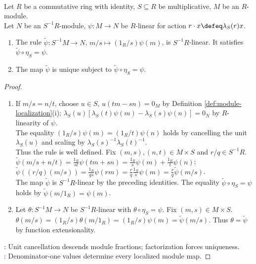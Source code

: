 \begin{theorem} \label{thm:module-localization-universal-property}
\\
Let $R$ be a commutative ring with identity, $S\subseteq R$ be multiplicative,  $M$ be an $R$-module.\\
Let $N$ be an $S^{-1}R$-module, $\psi:M\to N$ be $R$-linear for action $r\cdot x\defeq\lambda_S(r)x$.
\begin{enumerate}[label=(\roman*)]
\setlength{\itemsep}{0pt}
\item The rule $\widetilde{\psi}:S^{-1}M\to N$, $m/s\mapsto(1_R/s)\psi(m)$, is $S^{-1}R$-linear. It satisfies $\widetilde{\psi}\circ\eta_S=\psi$.
\item The map $\widetilde{\psi}$ is unique subject to $\widetilde{\psi}\circ\eta_S=\psi$.
\end{enumerate}
\begin{proof}
\begin{enumerate}[label=(\roman*)]
\setlength{\itemsep}{0pt}
\item If $m/s=n/t$, choose $u\in S$, $u(tm-sn)=0_M$ by Definition \ref{def:module-localization}(i); $\lambda_S(u)[\lambda_S(t)\psi(m)-\lambda_S(s)\psi(n)]=0_N$ by $R$-linearity of $\psi$.\\
The equality $(1_R/s)\psi(m)=(1_R/t)\psi(n)$ holds by cancelling the unit $\lambda_S(u)$ and scaling by $\lambda_S(s)^{-1}\lambda_S(t)^{-1}$.\\
Thus the rule is well defined. Fix $(m,s),(n,t)\in M\times S$ and $r/q\in S^{-1}R$.\\
$\widetilde{\psi}(m/s+n/t)=\frac{1_R}{st}\psi(tm+sn)=\frac{1_R}{s}\psi(m)+\frac{1_R}{t}\psi(n)$; $\widetilde{\psi}((r/q)(m/s))=\frac{1_R}{qs}\psi(rm)=\frac{r}{q}\frac{1_R}{s}\psi(m)=\frac{r}{q}\widetilde{\psi}(m/s)$.\\
The map $\widetilde{\psi}$ is $S^{-1}R$-linear by the preceding identities. The equality $\widetilde{\psi}\circ\eta_S=\psi$ holds by $\widetilde{\psi}(m/1_R)=\psi(m)$.
\item Let $\theta:S^{-1}M\to N$ be $S^{-1}R$-linear with $\theta\circ\eta_S=\psi$. Fix $(m,s)\in M\times S$.\\
$\theta(m/s)=(1_R/s)\theta(m/1_R)=(1_R/s)\psi(m)=\widetilde{\psi}(m/s)$. Thus $\theta=\widetilde{\psi}$ by function extensionality.
\end{enumerate}
: Unit cancellation descends module fractions; factorization forces uniqueness.\\
: Denominator-one values determine every localized module map.
\end{proof}
\end{theorem}

